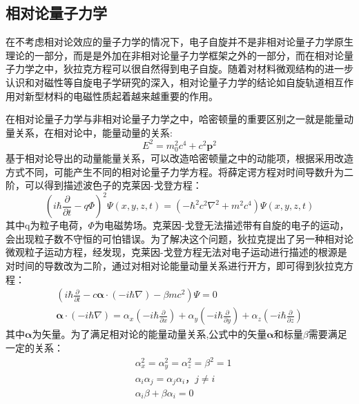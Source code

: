 \subsection{相对论量子力学}

在不考虑相对论效应的量子力学的情况下，电子自旋并不是非相对论量子力学原生理论的一部分，而是是外加在非相对论量子力学框架之外的一部分，而在相对论量子力学之中，狄拉克方程可以很自然得到电子自旋。随着对材料微观结构的进一步认识和对磁性等自旋电子学研究的深入，相对论量子力学的结论如自旋轨道相互作用对新型材料的电磁性质起着越来越重要的作用。

在相对论量子力学与非相对论量子力学之中，哈密顿量的重要区别之一就是能量动量关系，在相对论中，能量动量的关系:
\begin{equation}
    \label{xdl}
    E^{2}=m_{0}^{2}c^{4}+c^{2}\bm{p}^{2}
\end{equation}
基于相对论导出的动量能量关系，可以改造哈密顿量之中的动能项，根据采用改造方式不同，可能产生不同的相对论量子力学方程。将薛定谔方程对时间导数升为二阶，可以得到描述波色子的克莱因-戈登方程：
\begin{equation}
    (i \hbar \frac{\partial}{\partial t}-q \varPhi )^{2}\varPsi (x,y,z,t)=(-\hbar^{2}c^{2} \nabla^{2} +m^{2}c^{4})\varPsi (x,y,z,t)
    \label{eq:kg}
\end{equation}
其中q为粒子电荷，$\varPhi$为电磁势场。克莱因-戈登无法描述带有自旋的电子的运动，会出现粒子数不守恒的可怕错误。为了解决这个问题，狄拉克提出了另一种相对论微观粒子运动方程，经发现，克莱因-戈登方程无法对电子运动进行描述的根源是对时间的导数改为二阶，通过对相对论能量动量关系进行开方，即可得到狄拉克方程：
\begin{gather}
        (i \hbar \frac{\partial}{\partial t}- c \bm{\alpha} \cdot (-i \hbar \nabla )-\beta m c^{2}) \varPsi =0 \\
        \bm{\alpha} \cdot (-i \hbar \nabla )= \alpha _{x}(-i \hbar \frac{\partial}{\partial x}) +\alpha _{y}(-i \hbar \frac{\partial}{\partial y})+\alpha _{z}(-i \hbar \frac{\partial}{\partial z})
    \label{eq:狄喇克方程}
\end{gather}
其中$\bm{\alpha}$为矢量。为了满足相对论的能量动量关系,公式中的矢量$\bm{\alpha}$和标量$\beta$需要满足一定的关系：
\begin{equation}
    \begin{split}
        &\alpha _{x}^{2}=\alpha _{y}^{2}=\alpha _{z}^{2}=\beta^{2}=1 \\
        &\alpha _{i}\alpha _{j}=\alpha _{j}\alpha _{i}\text{，}j\neq i \\
        &\alpha _{i}\beta+\beta\alpha _{i}=0
    \end{split}
    \label{eq:tj}
\end{equation}
